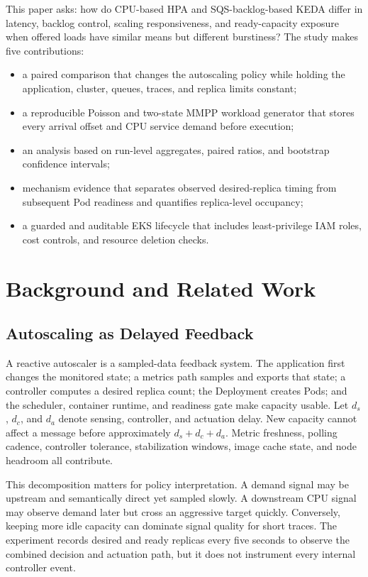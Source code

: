 \documentclass[conference]{IEEEtran}
\begin{document}
This paper asks: how do CPU-based HPA and SQS-backlog-based KEDA differ in
latency, backlog control, scaling responsiveness, and ready-capacity exposure
when offered loads have similar means but different burstiness? The study makes
five contributions:

\begin{itemize}
  \item a paired comparison that changes the autoscaling policy while holding
  the application, cluster, queues, traces, and replica limits constant;
  \item a reproducible Poisson and two-state MMPP workload generator that stores
  every arrival offset and CPU service demand before execution;
  \item an analysis based on run-level aggregates, paired ratios, and bootstrap
  confidence intervals;
  \item mechanism evidence that separates observed desired-replica timing from
  subsequent Pod readiness and quantifies replica-level occupancy;
  \item a guarded and auditable EKS lifecycle that includes least-privilege
  IAM roles, cost controls, and resource deletion checks.
\end{itemize}

\section{Background and Related Work}

\subsection{Autoscaling as Delayed Feedback}

A reactive autoscaler is a sampled-data feedback system. The application first
changes the monitored state; a metrics path samples and exports that state; a
controller computes a desired replica count; the Deployment creates Pods; and
the scheduler, container runtime, and readiness gate make capacity usable. Let
$d_s$, $d_c$, and $d_a$ denote sensing, controller, and actuation delay. New
capacity cannot affect a message before approximately $d_s+d_c+d_a$. Metric
freshness, polling cadence, controller tolerance, stabilization windows, image
cache state, and node headroom all contribute.

This decomposition matters for policy interpretation. A demand signal may be
upstream and semantically direct yet sampled slowly. A downstream CPU signal
may observe demand later but cross an aggressive target quickly. Conversely,
keeping more idle capacity can dominate signal quality for short traces. The
experiment records desired and ready replicas every five seconds to observe the
combined decision and actuation path, but it does not instrument every internal
controller event.
\end{document}
